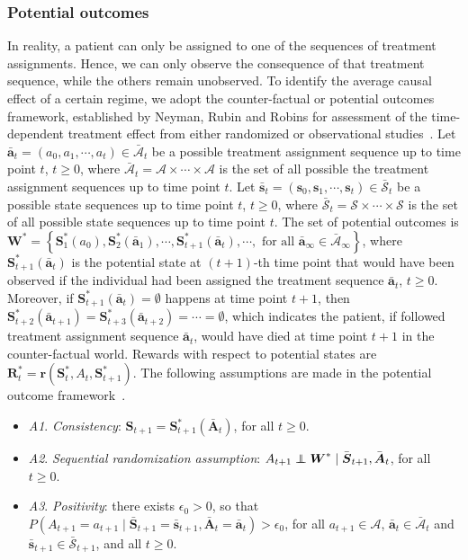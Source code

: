 \documentclass{article}
\newcommand{\bs}{ \boldsymbol}
\newcommand{\ml}{\mathcal}
\newcommand{\br}{\bar}
\newcommand{\lt}{\left}
\newcommand{\rt}{\right}
\newcommand\indep{\protect\mathpalette{\protect\independenT}{\perp}}
\def\independenT#1#2{\mathrel{\rlap{$#1#2$}\mkern2mu{#1#2}}}
\begin{document}
\subsubsection*{Potential outcomes}
In reality, a patient can only be assigned to one of the sequences of treatment assignments. Hence, we can only observe the consequence of that treatment sequence, while the others remain unobserved. To identify the average causal effect of a certain regime, we adopt the counter-factual or potential outcomes framework,  established by Neyman, Rubin and Robins for assessment of the time-dependent treatment effect from either randomized or observational studies~\cite{Neyman,Robins1997,Rubin1980}. Let $\br{\bs{a}}_{t} = (a_0, a_1, \cdots, a_t) \in \br{\bs{\ml{A}}}_{t}$ be a possible treatment assignment sequence up to time point $t$, $t \ge 0$, where $\br{\bs{\ml{A}}}_t = \ml{A} \times \cdots \times \ml{A}$ is the set of all possible the treatment assignment sequences up to time point $t$. Let $\br{\bs{s}}_{t} = (\bs{s}_0, \bs{s}_1, \cdots, \bs{s}_t) \in \br{\bs{\ml{S}}}_{t}$ be a possible state sequences up to time point $t$, $t \ge 0$, where $\br{\bs{\ml{S}}}_t = \bs{\ml{S}} \times \cdots \times \bs{\ml{S}} $ is the set of all possible state sequences up to time point $t$. The set of potential outcomes is $\bs{W}^* = \lt\{\bs{S}^*_1(a_0), \bs{S}^*_2(\br{\bs{a}}_1),\cdots,  \bs{S}^*_{t+1}(\br{\bs{a}}_{t}), \cdots, \text{ for all } \br{\bs{a}}_{\infty} \in \br{\bs{\ml{A}}}_{\infty} \rt\}$, where $\bs{S}^*_{t+1}(\br{\bs{a}}_{t})$ is the potential state at $(t+1)$-th time point that would have been observed if the individual had been assigned the treatment sequence $\br{\bs{a}}_{t}$, $t \ge 0$. Moreover, if $\bs{S}_{t+1}^*(\br{\bs{a}}_{t}) = \bs{\emptyset}$ happens at time point $t+1$, then $\bs{S}_{t+2}^*(\br{\bs{a}}_{t+1}) =\bs{S}_{t+3}^*(\br{\bs{a}}_{t+2}) = \cdots = \bs{\emptyset}$, which indicates the patient, if followed treatment assignment sequence $\br{\bs{a}}_t$, would have died at time point $t+1$ in the counter-factual world.  Rewards with respect to potential states are $\bs{R}^*_t = \bs{r}(\bs{S}^*_t, A_t, \bs{S}^*_{t+1})$. The following assumptions are made in the potential outcome framework~\cite{Neyman, Rubin2005, Rubin1980, Robins1997, Hernan2006}.
\begin{itemize}
	\item  \textit{A1}. \textit{Consistency}:  $\bs{S}_{t+1} = \bs{S}^*_{t+1}(\br{\bs{A}}_{t})$, for all $t \ge 0$.
	\item \textit{A2}.  \textit{Sequential randomization assumption}: $A_{t+1} \indep \bs{W}^* \mid \br{\bs{S}}_{t+1}, \br{\bs{A}}_{t}$, for all $t \ge 0$.
	\item \textit{A3}. \textit{Positivity}: there exists $\epsilon_0 > 0$, so that $P\lt( A_{t+1} = a_{t+1} \mid \br{\bs{S}}_{t+1} = \br{\bs{s}}_{t+1}, \br{\bs{A}}_{t} = \br{\bs{a}}_{t} \rt) > \epsilon_0$, for all $a_{t+1} \in \mathcal{A}$, $\br{\bs{a}}_{t} \in \br{\bs{\ml{A}}}_t$ and $\br{\bs{s}}_{t+1} \in \br{\bs{\ml{S}}}_{t+1}$, and all $t \ge 0$.	 
\end{itemize}
\end{document}
